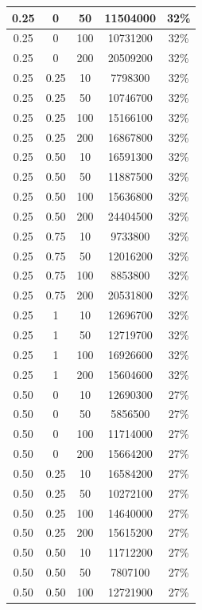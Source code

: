\documentclass[a4paper,12pt]{report}
\begin{document}
\begin{longtable}{ | c | c | c | c | c | }
			0.25 & 0 & 50 & 11504000 & 32\% \\ \hline
			0.25 & 0 & 100 & 10731200 & 32\% \\ \hline
			0.25 & 0 & 200 & 20509200 & 32\% \\ \hline
			0.25 & 0.25 & 10 & 7798300 & 32\% \\ \hline
			0.25 & 0.25 & 50 & 10746700 & 32\% \\ \hline
			0.25 & 0.25 & 100 & 15166100 & 32\% \\ \hline
			0.25 & 0.25 & 200 & 16867800 & 32\% \\ \hline
			0.25 & 0.50 & 10 & 16591300 & 32\% \\ \hline
			0.25 & 0.50 & 50 & 11887500 & 32\% \\ \hline
			0.25 & 0.50 & 100 & 15636800 & 32\% \\ \hline
			0.25 & 0.50 & 200 & 24404500 & 32\% \\ \hline
			0.25 & 0.75 & 10 & 9733800 & 32\% \\ \hline
			0.25 & 0.75 & 50 & 12016200 & 32\% \\ \hline
			0.25 & 0.75 & 100 & 8853800 & 32\% \\ \hline
			0.25 & 0.75 & 200 & 20531800 & 32\% \\ \hline
			0.25 & 1 & 10 & 12696700 & 32\% \\ \hline
			0.25 & 1 & 50 & 12719700 & 32\% \\ \hline
			0.25 & 1 & 100 & 16926600 & 32\% \\ \hline
			0.25 & 1 & 200 & 15604600 & 32\% \\ \hline
			0.50 & 0 & 10 & 12690300 & 27\% \\ \hline
			0.50 & 0 & 50 & 5856500 & 27\% \\ \hline
			0.50 & 0 & 100 & 11714000 & 27\% \\ \hline
			0.50 & 0 & 200 & 15664200 & 27\% \\ \hline
			0.50 & 0.25 & 10 & 16584200 & 27\% \\ \hline
			0.50 & 0.25 & 50 & 10272100 & 27\% \\ \hline
			0.50 & 0.25 & 100 & 14640000 & 27\% \\ \hline
			0.50 & 0.25 & 200 & 15615200 & 27\% \\ \hline
			0.50 & 0.50 & 10 & 11712200 & 27\% \\ \hline
			0.50 & 0.50 & 50 & 7807100 & 27\% \\ \hline
			0.50 & 0.50 & 100 & 12721900 & 27\% \\ \hline

\end{longtable}
\end{document}
